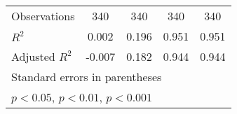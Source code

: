 {\begin{tabular}{l*{4}{c}}
\hline
Observations        &         340         &         340         &         340         &         340         \\
\(R^{2}\)           &       0.002         &       0.196         &       0.951         &       0.951         \\
Adjusted \(R^{2}\)  &      -0.007         &       0.182         &       0.944         &       0.944         \\
\hline\hline
\multicolumn{5}{l}{\footnotesize Standard errors in parentheses}\\
\multicolumn{5}{l}{\footnotesize \sym{*} \(p<0.05\), \sym{**} \(p<0.01\), \sym{***} \(p<0.001\)}\\
\end{tabular}
}
